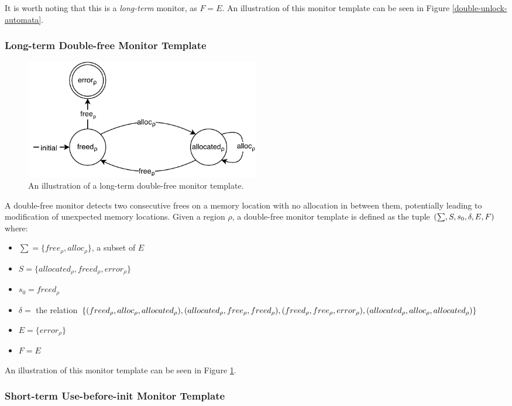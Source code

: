 \noindent It is worth noting that this is a \textit{long-term} monitor, as $F = E$. An illustration of this monitor template can be seen in Figure \ref{double-unlock-automata}. 

\subsubsection*{Long-term Double-free Monitor Template}

\begin{figure}[H]
    \centering
    \includegraphics[width=0.5\textwidth]{algorithm/figures/double-free}
    \caption{An illustration of a long-term double-free monitor template.}
    \label{double-free-automata}
\end{figure}

A double-free monitor detects two consecutive frees on a memory location with no allocation in between them, potentially leading to modification of unexpected memory locations. Given a region $\rho$, a double-free monitor template is defined as the tuple $(\sum, S, s_0, \delta, E, \\F)$ where: 

\begin{itemize}
    \item $\sum = \{free_\rho, alloc_\rho\}$, a subset of $E$
    \item $S = \{ allocated_\rho, freed_\rho, error_\rho \}$
    \item $s_0 = freed_\rho$ 
    \item $\delta =$ the relation $\{(freed_\rho, alloc_\rho, allocated_\rho), (allocated_\rho, free_\rho, freed_\rho), \\
    (freed_\rho, free_\rho, error_\rho), (allocated_\rho, alloc_\rho, allocated_\rho)\}$ 
    \item $E = \{ error_\rho \}$  
    \item $F = E$
\end{itemize}

An illustration of this monitor template can be seen in Figure \ref{double-free-automata}. 

\subsubsection*{Short-term Use-before-init Monitor Template}

